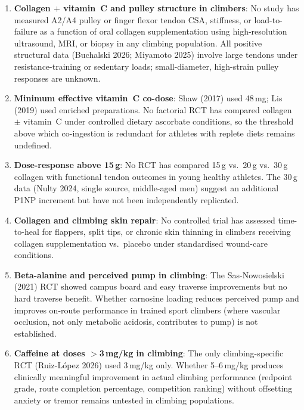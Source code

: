 \begin{enumerate}[noitemsep]

  \item \textbf{Collagen $+$ vitamin~C and pulley structure in climbers}: No study has measured A2/A4 pulley or finger flexor tendon CSA, stiffness, or load-to-failure as a function of oral collagen supplementation using high-resolution ultrasound, MRI, or biopsy in any climbing population. All positive structural data (Buchalski 2026; Miyamoto 2025) involve large tendons under resistance-training or sedentary loads; small-diameter, high-strain pulley responses are unknown.

  \item \textbf{Minimum effective vitamin~C co-dose}: Shaw (2017) used 48\,mg; Lis (2019) used enriched preparations. No factorial RCT has compared collagen $\pm$ vitamin~C under controlled dietary ascorbate conditions, so the threshold above which co-ingestion is redundant for athletes with replete diets remains undefined.

  \item \textbf{Dose-response above 15\,g}: No RCT has compared 15\,g vs.\ 20\,g vs.\ 30\,g collagen with functional tendon outcomes in young healthy athletes. The 30\,g data (Nulty 2024, single source, middle-aged men) suggest an additional P1NP increment but have not been independently replicated.

  \item \textbf{Collagen and climbing skin repair}: No controlled trial has assessed time-to-heal for flappers, split tips, or chronic skin thinning in climbers receiving collagen supplementation vs.\ placebo under standardised wound-care conditions.

  \item \textbf{Beta-alanine and perceived pump in climbing}: The Sas-Nowosielski (2021) RCT showed campus board and easy traverse improvements but no hard traverse benefit. Whether carnosine loading reduces perceived pump and improves on-route performance in trained sport climbers (where vascular occlusion, not only metabolic acidosis, contributes to pump) is not established.

  \item \textbf{Caffeine at doses $>$3\,mg/kg in climbing}: The only climbing-specific RCT (Ruiz-L\'opez 2026) used 3\,mg/kg only. Whether 5--6\,mg/kg produces clinically meaningful improvement in actual climbing performance (redpoint grade, route completion percentage, competition ranking) without offsetting anxiety or tremor remains untested in climbing populations.


\end{enumerate}
